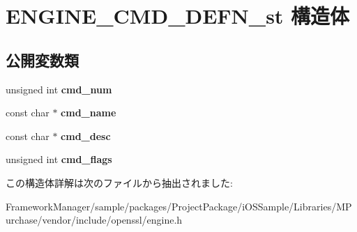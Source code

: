 \hypertarget{struct_e_n_g_i_n_e___c_m_d___d_e_f_n__st}{}\section{E\+N\+G\+I\+N\+E\+\_\+\+C\+M\+D\+\_\+\+D\+E\+F\+N\+\_\+st 構造体}
\label{struct_e_n_g_i_n_e___c_m_d___d_e_f_n__st}
\subsection*{公開変数類}
\begin{DoxyCompactItemize}
\item 
\hypertarget{struct_e_n_g_i_n_e___c_m_d___d_e_f_n__st_a4868776e2cc8f219c161072902b27761}{}unsigned int {\bfseries cmd\+\_\+num}\label{struct_e_n_g_i_n_e___c_m_d___d_e_f_n__st_a4868776e2cc8f219c161072902b27761}

\item 
\hypertarget{struct_e_n_g_i_n_e___c_m_d___d_e_f_n__st_a852b7bb98dcb5c946e4574f33cbc40ac}{}const char $\ast$ {\bfseries cmd\+\_\+name}\label{struct_e_n_g_i_n_e___c_m_d___d_e_f_n__st_a852b7bb98dcb5c946e4574f33cbc40ac}

\item 
\hypertarget{struct_e_n_g_i_n_e___c_m_d___d_e_f_n__st_aeb668f4e30209755aa41b7fba3cd2895}{}const char $\ast$ {\bfseries cmd\+\_\+desc}\label{struct_e_n_g_i_n_e___c_m_d___d_e_f_n__st_aeb668f4e30209755aa41b7fba3cd2895}

\item 
\hypertarget{struct_e_n_g_i_n_e___c_m_d___d_e_f_n__st_aa2dae056d36094415cdc11e6c7cac4a5}{}unsigned int {\bfseries cmd\+\_\+flags}\label{struct_e_n_g_i_n_e___c_m_d___d_e_f_n__st_aa2dae056d36094415cdc11e6c7cac4a5}

\end{DoxyCompactItemize}


この構造体詳解は次のファイルから抽出されました\+:\begin{DoxyCompactItemize}
\item 
Framework\+Manager/sample/packages/\+Project\+Package/i\+O\+S\+Sample/\+Libraries/\+M\+Purchase/vendor/include/openssl/engine.\+h\end{DoxyCompactItemize}

